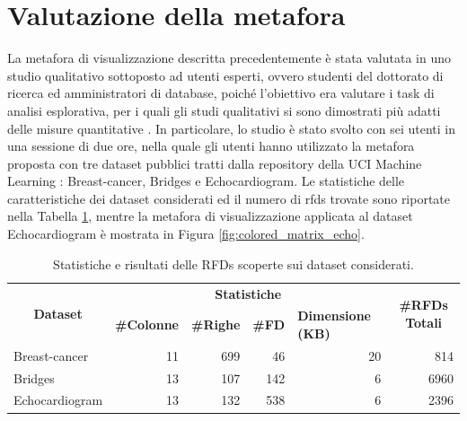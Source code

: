 \section{Valutazione della metafora}
La metafora di visualizzazione descritta precedentemente \`{e} stata valutata \cite{mdvisualization} in uno studio qualitativo sottoposto ad utenti esperti, ovvero studenti del dottorato di ricerca ed amministratori di database, poich\'{e} l'obiettivo era valutare i task di analisi esplorativa, per i quali gli studi qualitativi si sono dimostrati pi\`{u} adatti delle misure quantitative \cite{informationvisualization,strategies4evaluatinginfo}. In particolare, lo studio \`{e} stato svolto con sei utenti in una sessione di due ore, nella quale gli utenti hanno utilizzato la metafora proposta con tre dataset pubblici tratti dalla repository della UCI Machine Learning \cite{ucirepository}: Breast-cancer, Bridges e Echocardiogram. Le statistiche delle caratteristiche dei dataset considerati ed il numero di \acrshort{rfds} trovate sono riportate nella Tabella \ref{table:1}, mentre la metafora di visualizzazione applicata al dataset Echocardiogram \`{e} mostrata in Figura \ref{fig:colored_matrix_echo}.
\begin{table}[h!]
\caption{Statistiche e risultati delle RFDs scoperte sui dataset considerati.}
\label{table:1}
\centering
\begin{tabular}{|l|rrrr|r|} 
\hline
\multicolumn{1}{|c|}{\multirow{2}{*}{\textbf{Dataset}}} & \multicolumn{4}{c|}{\textbf{Statistiche}}                                                                                              & \multicolumn{1}{c|}{\multirow{2}{*}{\textbf{\#RFDs Totali}}}  \\
\multicolumn{1}{|c|}{}                         & \multicolumn{1}{l}{\textbf{\#Colonne}} & \multicolumn{1}{l}{\textbf{\#Righe}} & \multicolumn{1}{l}{\textbf{\#FD}} & \multicolumn{1}{l|}{\textbf{Dimensione (KB)}} & \multicolumn{1}{c|}{}                                \\ 
\hline
Breast-cancer                                  & 11                            & 699                         & 46                       & 20                                   & 814                                                  \\
Bridges                                        & 13                            & 107                         & 142                      & 6                                    & 6960                                                 \\
Echocardiogram                                 & 13                            & 132                         & 538                      & 6                                    & 2396                                                 \\
\hline
\end{tabular}
\end{table}
